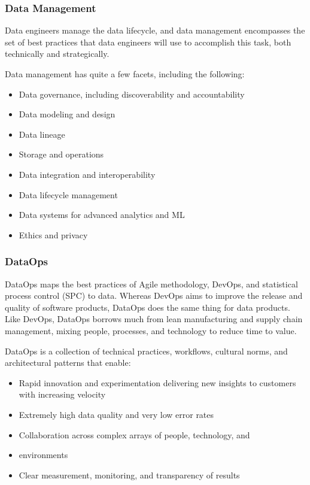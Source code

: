\documentclass[12pt]{book}
\begin{document}
\subsubsection{Data Management}
Data engineers manage the data lifecycle, and data management encompasses the set of best practices that data engineers will use to accomplish this task, both technically and strategically.

Data management has quite a few facets, including the following:\\
\begin{itemize}
    \item Data governance, including discoverability and accountability
    \item Data modeling and design
    \item Data lineage
    \item Storage and operations
    \item Data integration and interoperability
    \item Data lifecycle management
    \item Data systems for advanced analytics and ML
    \item Ethics and privacy
\end{itemize}


\subsubsection{DataOps}
DataOps maps the best practices of Agile methodology, DevOps, and statistical process control (SPC) to data. Whereas DevOps aims to improve the release and quality of software products, DataOps does the same thing for data products.
Like DevOps, DataOps borrows much from lean manufacturing and supply chain management, mixing people, processes, and technology to reduce time to value.

DataOps is a collection of technical practices, workflows, cultural norms, and architectural patterns that enable:
\begin{itemize}
    \item Rapid innovation and experimentation delivering new insights to     customers with increasing velocity
    \item Extremely high data quality and very low error rates
    \item Collaboration across complex arrays of people, technology, and
    \item environments
    \item Clear measurement, monitoring, and transparency of results
\end{itemize}
\end{document}
